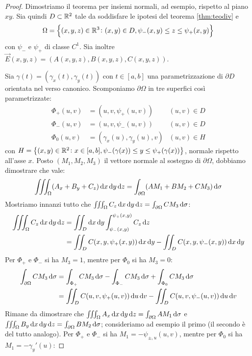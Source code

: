 \begin{proof}
	Dimostriamo il teorema per insiemi normali, ad esempio, rispetto al piano $ xy $. Sia quindi $ D \subset \mathbb{R}^2 $ tale da soddisfare le ipotesi del teorema \ref{thm:teodiv} e
	\[ \Omega = \left\{ (x,y,z) \in \mathbb{R}^3 \colon (x,y) \in D, \psi_-(x,y) \leq z \leq \psi_+(x,y) \right\} \]
	con $ \psi_- $ e $ \psi_+ $ di classe $ C^1 $. Sia inoltre $ \vec{E}(x,y,z) = \left( A(x,y,z), B(x,y,z), C(x,y,z) \right) $.
	
	Sia $ \gamma(t) = (\gamma_x(t),\gamma_y(t))$ con $ t \in [a,b] $ una parametrizzazione di $ \partial D $ orientata nel verso canonico. Scomponiamo $ \partial\Omega $ in tre superfici così parametrizzate:
	\begin{align*}
		\Phi_+(u,v) &= \left( u,v,\psi_+(u,v) \right) & (u,v) \in D \\
		\Phi_-(u,v) &= \left( u,v,\psi_-(u,v) \right) & (u,v) \in D \\
		\Phi_0(u,v) &= \left( \gamma_x(u), \gamma_y(u), v \right) &  (u,v) \in H
	\end{align*}
	con $ H = \left\{ (x,y) \in \mathbb{R}^2 \colon x \in [a,b], \psi_-(\gamma(x)) \leq y \leq \psi_+(\gamma(x)) \right\} $, normale rispetto all'asse $ x $.
	Posto $ (M_1,M_2,M_3) $ il vettore normale al sostegno di $ \partial\Omega $, dobbiamo dimostrare che vale:
	\[ \iiint_\Omega (A_x + B_y + C_z) \dif{x}\dif{y}\dif{z} = \int_{\partial\Omega} (AM_1 + BM_2 + CM_3) \dif{\sigma} \]
	Mostriamo innanzi tutto che $ \iiint_\Omega C_z \dif{x}\dif{y}\dif{z} = \int_{\partial\Omega} CM_3 \dif\sigma $:
	\begin{align*}
		\iiint_\Omega C_z \dif{x}\dif{y}\dif{z} &= \iint_D \dif{x} \dif{y} \int_{\psi_-(x,y)}^{\psi_+(x,y)} C_z \dif{z} \\
		&= \iint_D C(x,y,\psi_+(x,y)) \dif{x}\dif{y} - \iint_D C(x,y,\psi_-(x,y)) \dif{x}\dif{y}
	\end{align*}
	Per $ \Phi_+ $ e $ \Phi_- $ si ha $ M_3 = 1 $, mentre per $ \Phi_0 $ si ha $ M_3 = 0 $:
	\begin{align*}
		\int_{\partial\Omega} CM_3 \dif{\sigma} &= \int_{\Phi_+} CM_3 \dif{\sigma} - \int_{\Phi_-} CM_3 \dif{\sigma} + \int_{\Phi_0} CM_3 \dif{\sigma} \\
		&= \iint_D C(u,v,\psi_+(u,v)) \dif{u}\dif{v} - \iint_D C(u,v,\psi_-(u,v)) \dif{u}\dif{v}
	\end{align*}
	Rimane da dimostrare che $ \iiint_\Omega A_x \dif{x}\dif{y}\dif{z} = \int_{\partial\Omega} AM_1 \dif\sigma $ e $ \iiint_\Omega B_y \dif{x}\dif{y}\dif{z} = \int_{\partial\Omega} BM_2 \dif\sigma $; consideriamo ad esempio il primo (il secondo è del tutto analogo). Per $ \Phi_+ $ e $ \Phi_- $ si ha $ M_1 = -\psi_{\pm,u} (u,v) $, mentre per $ \Phi_0 $ si ha $ M_1 = -\gamma_y'(u) $:

\end{proof}
